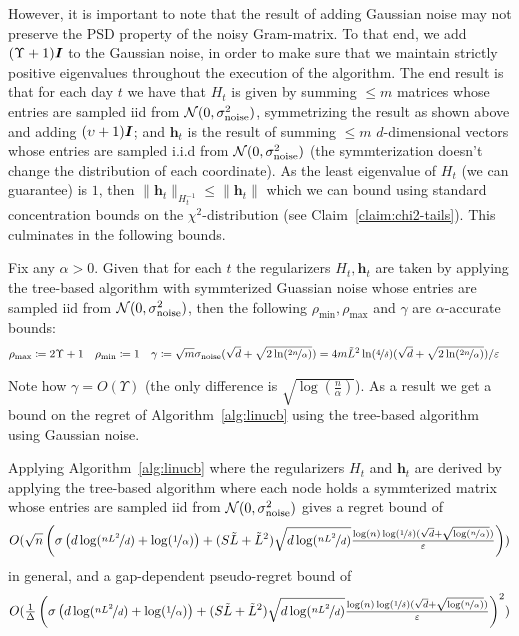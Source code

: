 \documentclass{article}
\renewcommand{\vec}[1]{\bm{#1}}
\newcommand{\defeq}{\coloneq}
\newcommand{\Normal}{\mathcal{N}}
\newcommand{\Eye}[1][]{\bm{I}\notblank{#1}{_{{#1}\times{#1}}}{}}
\begin{document}
However, it is important to note that the result of adding Gaussian noise may not preserve the PSD property of the noisy Gram-matrix. To that end, we add $(\Upsilon +1)\Eye$ to the Gaussian noise, in order to make sure that we maintain strictly positive eigenvalues throughout the execution of the algorithm. The end result is that for each day $t$ we have that $H_t$ is given by summing $\leq m$ matrices whose entries are sampled iid from $\Normal(0,\sigma_{\rm noise}^2)$, symmetrizing the result as shown above and adding $(\upsilon+1)\Eye$; and $\vec h_t$ is the result of summing $\leq m$ $d$-dimensional vectors whose entries are sampled i.i.d from $\Normal(0,\sigma_{\rm noise}^2)$ (the symmterization doesn't change the distribution of each coordinate). As the least eigenvalue of $H_t$ (we can guarantee) is $1$, then $\|\vec h_t\|_{H_t^{-1}} \leq \|\vec h_t\|$ which we can bound using standard concentration bounds on the $\chi^2$-distribution (see Claim~\ref{claim:chi2-tails}). This culminates in the following bounds.
\begin{proposition}
\label{pro:accurate_bounds_for_Gaussian}
Fix any $\alpha>0$. Given that for each $t$ the regularizers $H_t, \vec h_t$ are taken by applying the tree-based algorithm with symmterized Guassian noise whose entries are sampled iid from $\Normal(0, \sigma_{\rm noise}^2)$, then the following $\rho_{\min},\rho_{\max}$ and $\gamma$ are $\alpha$-accurate bounds:
\begin{align*}
    &\rho_{\max}\defeq  2\Upsilon+1 &&\rho_{\min}\defeq 1 && \gamma \defeq \sqrt m\sigma_{\rm noise}(\sqrt d + \sqrt{2\ln(\nicefrac{2n}\alpha)})=4m\tilde L^2 \ln(\nicefrac 4 \delta) (\sqrt d + \sqrt{2\ln(\nicefrac{2n}\alpha)})/\varepsilon
  \end{align*}
\end{proposition}
Note how $\gamma=O(\Upsilon)$ (the only difference is $\sqrt{\log(\tfrac n \alpha)}$).
As a result we get a bound on the regret of Algorithm~\ref{alg:linucb} using the tree-based algorithm using Gaussian noise.
\begin{corollary}
\label{cor:regret_with_Wishart}
Applying Algorithm~\ref{alg:linucb} where the regularizers $H_t$ and $\vec h_t$ are derived by applying the tree-based algorithm where each node holds a symmterized matrix whose entries are sampled iid from $\Normal(0,\sigma_{\rm noise}^2)$ gives a regret bound of
\[O(\sqrt n \left(  \sigma\left(d\log(\nicefrac{nL^2}{d}) + \log(\nicefrac 1 \alpha) \right) + (S\tilde{L}+\tilde{L}^2)\sqrt{d\log(\nicefrac{nL^2}{d})}\tfrac{\log(n)\log(\nicefrac 1 \delta)(\sqrt d + \sqrt{\log(\nicefrac n \alpha)})}{\varepsilon}\right) )\]
in general, and a gap-dependent pseudo-regret bound of
\[O(\tfrac 1 \Delta \left(  \sigma\left(d\log(\nicefrac{nL^2}{d}) + \log(\nicefrac 1 \alpha) \right) + (S\tilde{L}+\tilde{L}^2)\sqrt{d\log(\nicefrac{nL^2}{d})}\tfrac{\log(n)\log(\nicefrac 1 \delta)(\sqrt d + \sqrt{\log(\nicefrac n \alpha)})}{\varepsilon}\right)^2 )\]
\end{corollary}
\end{document}
